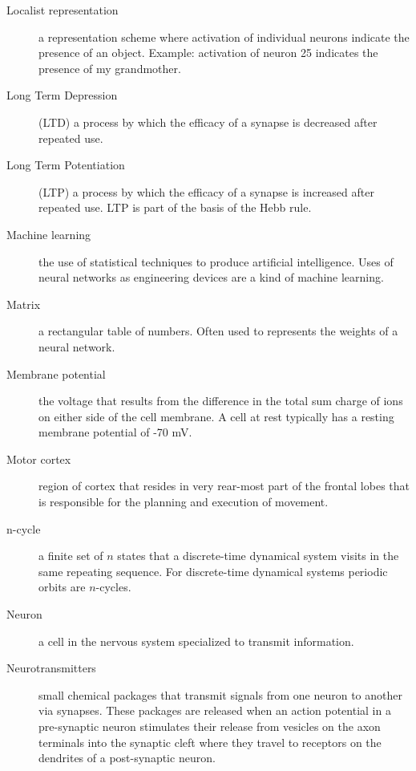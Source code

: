 \begin{description}
\item[Localist representation] a representation scheme where activation of individual neurons indicate the presence of an object. Example: activation of neuron 25 indicates the presence of my grandmother.

\item[Long Term Depression] (LTD) a  process by which the efficacy of a synapse is decreased after repeated use.

\item[Long Term Potentiation] (LTP) a process by which the efficacy of a synapse is increased after repeated use. LTP is part of the basis of the Hebb rule.

\item[Machine learning] the use of statistical techniques to produce artificial intelligence. Uses of neural networks as engineering devices are a kind of machine learning.

\item[Matrix] a rectangular table of numbers. Often used to represents the 
weights of a neural network.

\item[Membrane potential] the voltage that results from the difference in the total sum charge of ions on either side of the cell membrane. A cell at rest typically has a resting membrane potential of -70 mV. 


\item[Motor cortex] region of cortex that resides in very rear-most part of the frontal lobes that is responsible for the planning and execution of movement. 

\item[n-cycle] a finite set of $n$ states that a discrete-time dynamical system visits in the same repeating sequence. For discrete-time dynamical systems periodic orbits are $n$-cycles.

\item[Neuron] a cell in the nervous system specialized to transmit information.

\item[Neurotransmitters] small chemical packages that transmit signals from one neuron to another via synapses. These packages are released when an action potential in a pre-synaptic neuron stimulates their release from vesicles on the axon terminals into the synaptic cleft where they travel to receptors on the dendrites of a post-synaptic neuron. 


\end{description}
